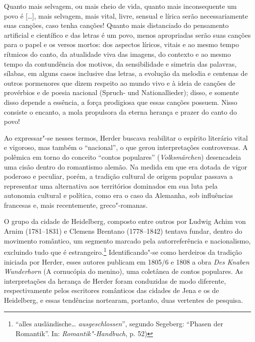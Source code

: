 \begin{hedraquote}
Quanto mais selvagem, ou mais cheio de vida, quanto mais inconsequente
um povo é [\ldots], mais selvagem, mais vital, livre, sensual e lírica
serão necessariamente suas canções, caso tenha canções! Quanto mais
distanciado do pensamento artificial e científico e das letras é um
povo, menos apropriadas serão suas canções para o papel e os versos
mortos: dos aspectos líricos, vitais e ao mesmo tempo rítmicos do
canto, da atualidade viva das imagens, do contexto e ao mesmo tempo da
contundência dos motivos, da sensibilidade e simetria das palavras,
sílabas, em alguns casos inclusive das letras, a evolução da melodia e
centenas de outros pormenores que dizem respeito ao mundo vivo e à
ideia de canções de provérbios e de poesia nacional (Spruch- und
Nationallieder); disso, e somente disso depende a essência, a força
prodigiosa que essas canções possuem. Nisso consiste o encanto, a mola
propulsora da eterna herança e prazer do canto do povo!
\end{hedraquote}


Ao expressar"-se nesses termos, Herder buscava reabilitar o espírito
literário vital e vigoroso, mas também o ``nacional'', o que gerou
interpretações controversas. A polêmica em torno do conceito ``contos
populares'' (\textit{Volksmärchen}) desencadeia uma cisão dentro 
do romantismo alemão. Na medida em que era dotada de vigor poderoso 
e peculiar, porém, a tradição cultural de origem popular passava a 
representar uma alternativa aos territórios dominados em sua luta 
pela autonomia cultural e política, como era o caso da Alemanha, 
sob influências francesas e, mais recentemente, greco"-romanas.

O grupo da cidade de Heidelberg, composto entre outros por Ludwig Achim
von Arnim (1781--1831) e Clemens Brentano (1778--1842) tentava fundar,
dentro do movimento romântico, um segmento marcado pela autorreferência
e nacionalismo, excluindo tudo que é estrangeiro.\footnote{ ``alles
ausländische\ldots{} \textit{ausgeschlossen}'', segundo Segeberg: ``Phasen der
Romantik''. In: \textit{Romantik"-Handbuch}, p. 52)} Identificando"-se
como herdeiros da tradição iniciada por Herder, esses autores publicam
em 1805/6 e 1808 a obra \textit{Des Knaben Wunderhorn} (A cornucópia
do menino), uma coletânea de contos populares. As interpretações da
herança de Herder foram conduzidas de modo diferente, respectivamente
pelos escritores românticos das cidades de Jena e os de Heidelberg, e
essas tendências nortearam, portanto, duas vertentes de pesquisa. 

